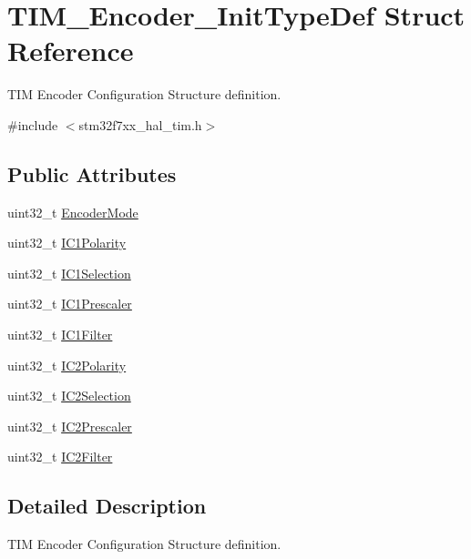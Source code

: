 \hypertarget{struct_t_i_m___encoder___init_type_def}{}\section{T\+I\+M\+\_\+\+Encoder\+\_\+\+Init\+Type\+Def Struct Reference}
\label{struct_t_i_m___encoder___init_type_def}


T\+IM Encoder Configuration Structure definition.  




{\ttfamily \#include $<$stm32f7xx\+\_\+hal\+\_\+tim.\+h$>$}

\subsection*{Public Attributes}
\begin{DoxyCompactItemize}
\item 
uint32\+\_\+t \mbox{\hyperlink{struct_t_i_m___encoder___init_type_def_ab1e4b0752d88c04081e3ff2fea6aa52e}{Encoder\+Mode}}
\item 
uint32\+\_\+t \mbox{\hyperlink{struct_t_i_m___encoder___init_type_def_a3e27323d593e4f3b95ebaa3772e79618}{I\+C1\+Polarity}}
\item 
uint32\+\_\+t \mbox{\hyperlink{struct_t_i_m___encoder___init_type_def_a85fbdebacff594ff1ad0d16eddfdc179}{I\+C1\+Selection}}
\item 
uint32\+\_\+t \mbox{\hyperlink{struct_t_i_m___encoder___init_type_def_a56307eb4766e3f0e1cd1cd3c4fc2157e}{I\+C1\+Prescaler}}
\item 
uint32\+\_\+t \mbox{\hyperlink{struct_t_i_m___encoder___init_type_def_a50f3051c1b568b9dcde146199f97f3fb}{I\+C1\+Filter}}
\item 
uint32\+\_\+t \mbox{\hyperlink{struct_t_i_m___encoder___init_type_def_abb7968a8ba34e13da1fb8f5916a754ce}{I\+C2\+Polarity}}
\item 
uint32\+\_\+t \mbox{\hyperlink{struct_t_i_m___encoder___init_type_def_a84a39a8667f296b4b3fbe1a0add58396}{I\+C2\+Selection}}
\item 
uint32\+\_\+t \mbox{\hyperlink{struct_t_i_m___encoder___init_type_def_ac80972d0e157508ff075815da58070cb}{I\+C2\+Prescaler}}
\item 
uint32\+\_\+t \mbox{\hyperlink{struct_t_i_m___encoder___init_type_def_a30cdb580735007aa9735b2f5cc133049}{I\+C2\+Filter}}
\end{DoxyCompactItemize}


\subsection{Detailed Description}
T\+IM Encoder Configuration Structure definition. 


